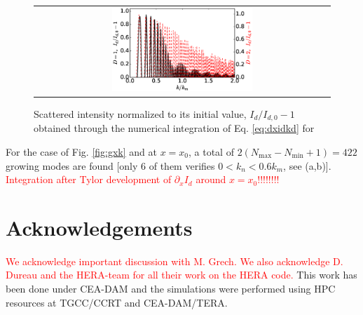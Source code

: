 \documentclass[
 reprint,
 amsmath,amssymb,
 aps,
]{revtex4-1}
\begin{document}
\begin{figure}[!]
\begin{tabular}{c}
\includegraphics[width=0.49\textwidth]{Idk.eps}
\end{tabular}
\caption{ \label{fig:idk}
Scattered intensity normalized to its initial value, $I_d/I_{d,0}-1$ obtained through 
the numerical integration of Eq. \eqref{eq:dxidkd} for 
 }
\end{figure}
For the case of Fig. \ref{fig:gxk} and at $x=x_0$, a total of $2(N_\mathrm{max}-N_\mathrm{min}+1) = 422$ growing modes are  found [only 6 of them verifies $0<k_n<0.6k_m$, see (a,b)].
\textcolor{red}{Integration after Tylor development of $\partial_x I_d$ around $x=x_0$!!!!!!!!}





\section*{Acknowledgements}
 \textcolor{red}{We acknowledge important discussion with M. Grech.  
 We also acknowledge D. Dureau and the HERA-team for all their work on the HERA code. }
This work has been done under   CEA-DAM and
the simulations were performed using HPC resources at TGCC/CCRT and CEA-DAM/TERA.

\end{document}

